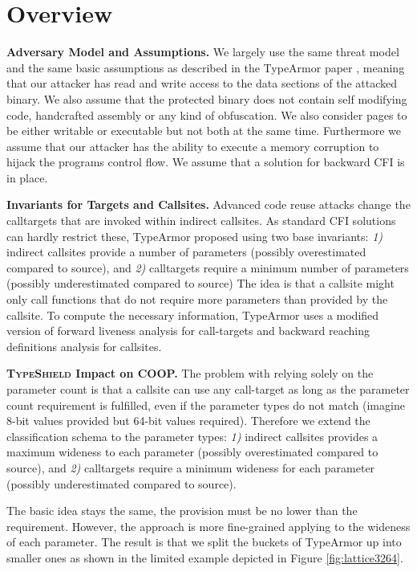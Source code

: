 \section{Overview}
\label{chapter:TypeShild Overview}

\textbf{Adversary Model and Assumptions.}
\label{Adversary Model}
We largely use the same threat model and the same basic assumptions as described in the TypeArmor 
paper \cite{veen:typearmor}, meaning that our attacker has read and write access to the data 
sections of the attacked binary.  We also assume that the protected binary does not contain 
self modifying code, handcrafted assembly or any kind of obfuscation. We also consider pages 
to be either writable or executable but not both at the same time. Furthermore we assume 
that our attacker has the ability to execute a memory corruption to hijack the programs 
control flow. We assume that a solution for backward CFI is in place.

\textbf{Invariants for Targets and Callsites.}
\label{Invariants for Targets and Callsites}
Advanced code reuse attacks change the calltargets that are invoked within indirect 
callsites. As standard CFI solutions can hardly restrict these, TypeArmor proposed using two base invariants:
\textit{1)} indirect callsites provide a number of parameters (possibly overestimated compared to source), and 
\textit{2)} calltargets require a minimum number of parameters (possibly underestimated compared to source)
The idea is that a callsite might only call functions that do not require more parameters than provided by the callsite. 
To compute the necessary information, TypeArmor uses a modified version of forward liveness analysis for call-targets and 
backward reaching definitions analysis for callsites.

\textbf{\textsc{TypeShield} Impact on COOP.}
\label{TypeShild Impact on COOP}
The problem with relying solely on the parameter count is that a callsite can use any call-target as long as the parameter count 
requirement is fulfilled, even if the parameter types do not match (imagine 8-bit values provided but 64-bit values required). 
Therefore we extend the classification schema to the parameter types:
\textit{1)} indirect callsites provides a maximum wideness to each parameter (possibly overestimated compared to source), and 
\textit{2)} calltargets require a minimum wideness for each parameter (possibly underestimated compared to source).

The basic idea stays the same, the provision must be no lower than the requirement. However, the approach is more fine-grained 
applying to the wideness of each parameter. The result is that we split the buckets of TypeArmor up into smaller ones as shown 
in the limited example depicted in Figure \ref{fig:lattice3264}.
